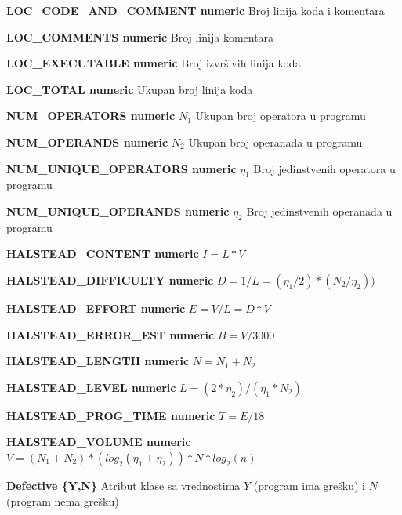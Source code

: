 \documentclass[12pt,oneside]{memoir}
\begin{document}
\textbf{LOC\_CODE\_AND\_COMMENT numeric} Broj linija koda i komentara

\textbf{LOC\_COMMENTS numeric} Broj linija komentara

\textbf{LOC\_EXECUTABLE numeric} Broj izvršivih linija koda

\textbf{LOC\_TOTAL numeric} Ukupan broj linija koda

\textbf{NUM\_OPERATORS numeric} $N_1$ Ukupan broj operatora u programu

\textbf{NUM\_OPERANDS numeric} $N_2$ Ukupan broj operanada u programu

\textbf{NUM\_UNIQUE\_OPERATORS numeric} $\eta_1$ Broj jedinstvenih operatora u programu

\textbf{NUM\_UNIQUE\_OPERANDS numeric} $\eta_2$ Broj jedinstvenih operanada u programu

\textbf{HALSTEAD\_CONTENT numeric} $I = L*V$

\textbf{HALSTEAD\_DIFFICULTY numeric} $D = 1/L = (\eta_1/2)*(N_2/\eta_2))$

\textbf{HALSTEAD\_EFFORT numeric} $E = V/L = D*V$

\textbf{HALSTEAD\_ERROR\_EST numeric} $B = V/3000$

\textbf{HALSTEAD\_LENGTH numeric} $N = N_1+N_2$

\textbf{HALSTEAD\_LEVEL numeric} $L = (2*\eta_2)/(\eta_1*N_2)$

\textbf{HALSTEAD\_PROG\_TIME numeric} $T = E/18$

\textbf{HALSTEAD\_VOLUME numeric} $V = (N_1+N_2)*(log_2(\eta_1+\eta_2))*N*log_2(n)$

\textbf{Defective \{Y,N\} } Atribut klase sa vrednostima $Y$ (program ima grešku) i $N$ (program nema grešku)
\end{document}

